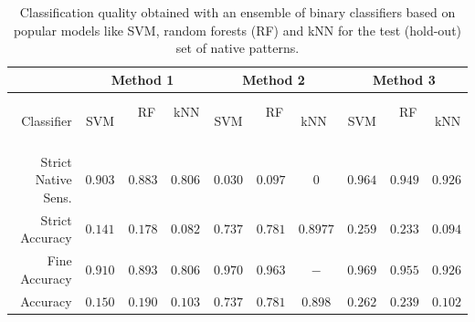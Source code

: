 \documentclass{llncs}
\begin{document}
\begin{table}[!htbp]
	\vspace{-12pt}
	\centering
	\caption{Classification quality obtained with an ensemble of binary classifiers based on popular models like SVM, random forests (RF) and kNN for the test (hold-out) set of native patterns.}
	\vspace{-3pt}
	\setlength{\tabcolsep}{5pt}
	\renewcommand{\arraystretch}{1}
	\footnotesize
	{	
		\begin{tabular}{|r||c|c|c||c|c|c||c|c|c|}
			\hline
			& \multicolumn{3}{c||}{Method 1} & \multicolumn{3}{c||}{Method 2} & \multicolumn{3}{c|}{Method 3}\\
			\hline
			Classifier & $\;\;$SVM$\;\;$ & $\;\;$RF$\;\;$ & $\,$kNN$\;\;$ & $\,$SVM$\;\;$ & $\;\;$RF$\;\;$ & $\,$kNN$\;\;$ & $\,$SVM$\;\;$ & $\;\;$RF$\;\;$ & $\,$kNN  \\
			\hline
			Strict Native Sens. & $0.903$ & $0.883$ & $0.806$ & $0.030$ & $0.097$ & $0$ & $0.964$ & $0.949$ & $0.926$ \\			
			Strict Accuracy  & $0.141$ & $0.178$ & $0.082$ & $0.737$ & $0.781$ & $0.8977$ & $0.259$ & $0.233$ & $0.094$ \\
			Fine Accuracy       & $0.910$ & $0.893$ & $0.806$ & $0.970$ & $0.963$ & $-$ & $0.969$ & $0.955$ & $0.926$ \\
			Accuracy  & $0.150$ & $0.190$ & $0.103$ & $0.737$ & $0.781$ & $0.898$ & $0.262$ & $0.239$ & $0.102$ \\
			\hline
		\end{tabular}	
	}
	\vspace{-0pt}
	\label{tab:results_classification_standard}
\end{table}
\end{document}
